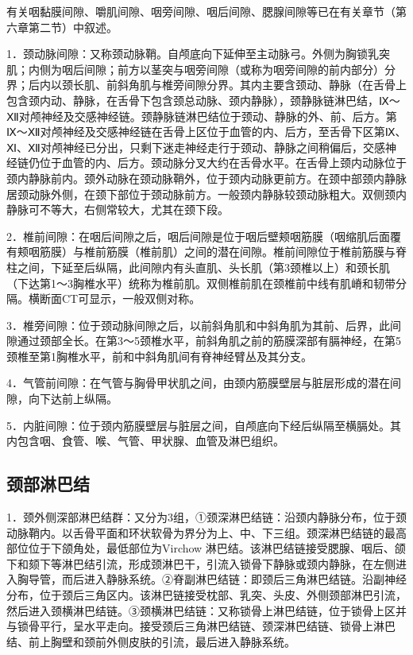 有关咽黏膜间隙、嚼肌间隙、咽旁间隙、咽后间隙、腮腺间隙等已在有关章节（第六章第二节）中叙述。

1．颈动脉间隙：又称颈动脉鞘。自颅底向下延伸至主动脉弓。外侧为胸锁乳突肌；内侧为咽后间隙；前方以茎突与咽旁间隙（或称为咽旁间隙的前内部分）分界；后内以颈长肌、前斜角肌与椎旁间隙分界。其内主要含颈动、静脉（在舌骨上包含颈内动、静脉，在舌骨下包含颈总动脉、颈内静脉），颈静脉链淋巴结，Ⅸ～Ⅻ对颅神经及交感神经链。颈静脉链淋巴结位于颈动、静脉的外、前、后方。第Ⅸ～Ⅻ对颅神经及交感神经链在舌骨上区位于血管的内、后方，至舌骨下区第Ⅸ、Ⅺ、Ⅻ对颅神经已分出，只剩下迷走神经走行于颈动、静脉之间稍偏后，交感神经链仍位于血管的内、后方。颈动脉分叉大约在舌骨水平。在舌骨上颈内动脉位于颈内静脉前内。颈外动脉在颈动脉鞘外，位于颈内动脉更前方。在颈中部颈内静脉居颈动脉外侧，在颈下部位于颈动脉前方。一般颈内静脉较颈动脉粗大。双侧颈内静脉可不等大，右侧常较大，尤其在颈下段。

2．椎前间隙：在咽后间隙之后，咽后间隙是位于咽后壁颊咽筋膜（咽缩肌后面覆有颊咽筋膜）与椎前筋膜（椎前肌）之间的潜在间隙。椎前间隙位于椎前筋膜与脊柱之间，下延至后纵隔，此间隙内有头直肌、头长肌（第3颈椎以上）和颈长肌（下达第1～3胸椎水平）统称为椎前肌。双侧椎前肌在颈椎前中线有肌嵴和韧带分隔。横断面CT可显示，一般双侧对称。

3．椎旁间隙：位于颈动脉间隙之后，以前斜角肌和中斜角肌为其前、后界，此间隙通过颈部全长。在第3～5颈椎水平，前斜角肌之前的筋膜深部有膈神经，在第5颈椎至第1胸椎水平，前和中斜角肌间有脊神经臂丛及其分支。

4．气管前间隙：在气管与胸骨甲状肌之间，由颈内筋膜壁层与脏层形成的潜在间隙，向下达前上纵隔。

5．内脏间隙：位于颈内筋膜壁层与脏层之间，自颅底向下经后纵隔至横膈处。其内包含咽、食管、喉、气管、甲状腺、血管及淋巴组织。

\subsection{颈部淋巴结}

1．颈外侧深部淋巴结群：又分为3组，①颈深淋巴结链：沿颈内静脉分布，位于颈动脉鞘内。以舌骨平面和环状软骨为界分为上、中、下三组。颈深淋巴结链的最高部位位于下颌角处，最低部位为Virchow
淋巴结。该淋巴结链接受腮腺、咽后、颌下和颏下等淋巴结引流，形成颈淋巴干，引流入锁骨下静脉或颈内静脉，在左侧进入胸导管，而后进入静脉系统。②脊副淋巴结链：即颈后三角淋巴结链。沿副神经分布，位于颈后三角区内。该淋巴链接受枕部、乳突、头皮、外侧颈部淋巴引流，然后进入颈横淋巴结链。③颈横淋巴结链：又称锁骨上淋巴结链，位于锁骨上区并与锁骨平行，呈水平走向。接受颈后三角淋巴结链、颈深淋巴结链、锁骨上淋巴结、前上胸壁和颈前外侧皮肤的引流，最后进入静脉系统。

